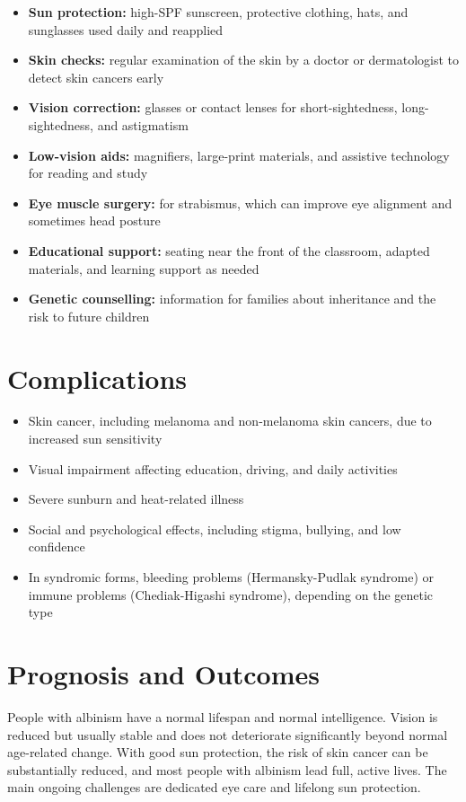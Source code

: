 \begin{itemize}
    \item \textbf{Sun protection:} high-SPF sunscreen, protective clothing, hats, and sunglasses used daily and reapplied
    \item \textbf{Skin checks:} regular examination of the skin by a doctor or dermatologist to detect skin cancers early
    \item \textbf{Vision correction:} glasses or contact lenses for short-sightedness, long-sightedness, and astigmatism
    \item \textbf{Low-vision aids:} magnifiers, large-print materials, and assistive technology for reading and study
    \item \textbf{Eye muscle surgery:} for strabismus, which can improve eye alignment and sometimes head posture
    \item \textbf{Educational support:} seating near the front of the classroom, adapted materials, and learning support as needed
    \item \textbf{Genetic counselling:} information for families about inheritance and the risk to future children
\end{itemize}

\section*{Complications}
\begin{itemize}
    \item Skin cancer, including melanoma and non-melanoma skin cancers, due to increased sun sensitivity
    \item Visual impairment affecting education, driving, and daily activities
    \item Severe sunburn and heat-related illness
    \item Social and psychological effects, including stigma, bullying, and low confidence
    \item In syndromic forms, bleeding problems (Hermansky-Pudlak syndrome) or immune problems (Chediak-Higashi syndrome), depending on the genetic type
\end{itemize}

\section*{Prognosis and Outcomes}
People with albinism have a normal lifespan and normal intelligence. Vision is reduced but usually stable and does not deteriorate significantly beyond normal age-related change. With good sun protection, the risk of skin cancer can be substantially reduced, and most people with albinism lead full, active lives. The main ongoing challenges are dedicated eye care and lifelong sun protection.


